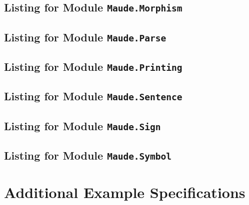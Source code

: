 \documentclass[11pt]{article}
\begin{document}
\subsection{Listing for Module \texttt{Maude.Morphism}}
\label{imp:Maude/Morphism.hs}

\clearpage
\subsection{Listing for Module \texttt{Maude.Parse}}
\label{imp:Maude/Parse.hs}

\clearpage
% 
\subsection{Listing for Module \texttt{Maude.Printing}}
\label{imp:Maude/Printing.hs}

\clearpage
\subsection{Listing for Module \texttt{Maude.Sentence}}
\label{imp:Maude/Sentence.hs}

\clearpage
% 
\subsection{Listing for Module \texttt{Maude.Sign}}
\label{imp:Maude/Sign.hs}

\clearpage
\subsection{Listing for Module \texttt{Maude.Symbol}}
\label{imp:Maude/Symbol.hs}



\clearpage
\section{Additional Example Specifications} %
\label{sec:appendix_example}
\end{document}
